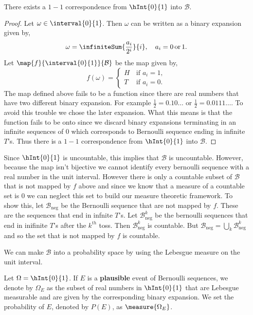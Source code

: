 \begin{Proposition}
    There exists a $1-1$ correspondence from $\hInt{0}{1}$ into $\mathcal{B}$.
\end{Proposition}
\begin{proof}
    Let $\omega \in \interval{0}{1}$. Then $\omega$ can be written as a binary expansion given by,
    \[\omega = \infiniteSum{\frac{a_i}{2^i}}{i},\quad a_i= 0\,\text{or}\,1.\]
    Let $\map{f}{\interval{0}{1}}{\mathcal{B}}$ be the map given by,
    \begin{equation*}
	f(\omega) = 
	\begin{cases}
	    H\,&\text{if $a_i = 1$},\\
	    T\,&\text{if $a_i = 0$}.
	\end{cases}
    \end{equation*}
    The map defined above fails to be a function since there are real numbers that have two
    different binary expansion. For example $\frac{1}{2} = 0.10\dots$ or 
    $\frac{1}{2} = 0.0111\dots$. To avoid this trouble we chose the later expansion. What this means
    is that the function fails to be onto since we discard binary expansions terminating in an
    infinite sequences of $0$ which corresponds to Bernoulli sequence ending in infinite $T$'s. Thus
    there is a $1-1$ correspondence from $\hInt{0}{1}$ into $\mathcal{B}$.
\end{proof}
\begin{Remark}
    Since $\hInt{0}{1}$ is uncountable, this implies that $\mathcal{B}$ is uncountable. However,
    because the map isn't bijective we cannot identify every bernoulli sequence with a real number
    in the unit interval. However there is only a countable subset of $\mathcal{B}$ that is not
    mapped by $f$ above and since we know that a measure of a countable set is $0$ we can neglect
    this set to build our measure theoretic framework. To show this, let $\mathcal{B}_{\text{neg}}$ be the
    Bernoulli sequence that are not mapped by $f$. These are the sequences that end in infnite
    $T$'s. Let $\mathcal{B}_{\text{neg}}^{k}$ be the bernoulli sequences that end in inifinite $T$'s
    after the $k^{th}$ toss. Then $\mathcal{B}_{\text{neg}}^{k}$ is countable. But 
    $\mathcal{B}_{\text{neg}} = \bigcup\limits_{k}\mathcal{B}_{\text{neg}}^{k}$ and so the set that
    is not mapped by $f$ is countable. 
\end{Remark}
We can make $\mathcal{B}$ into a probability space by using the Lebesgue measure on the unit
interval.
\begin{Definition}[name=Borel Principle]
    Let $\Omega = \hInt{0}{1}$. If $E$ is a \textbf{plausible} event of Bernoulli sequences, we
    denote by $\Omega_{E}$ as the subset of real numbers in $\hInt{0}{1}$ that are Lebesgue
    measurable and are given by the corresponding binary expansion. 
    We set the probability of $E$, denoted by $P(E)$, as $\measure{\Omega_{E}}$.  
\end{Definition}
